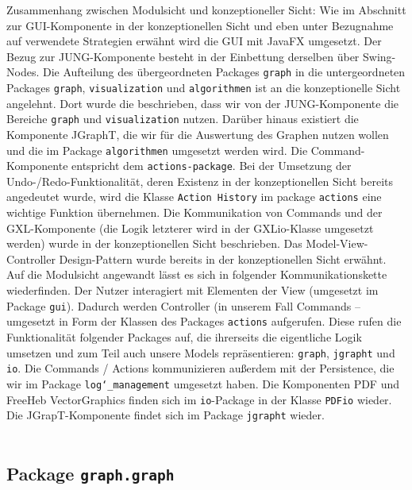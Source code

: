 \documentclass[enabledeprecatedfontcommands,fontsize=11pt,paper=a4,twoside]{scrartcl}
\newcounter{one}
\begin{document}
Zusammenhang zwischen Modulsicht und konzeptioneller Sicht: Wie im Abschnitt zur GUI-Komponente  in der konzeptionellen Sicht und eben unter Bezugnahme auf verwendete Strategien erwähnt wird die GUI mit JavaFX umgesetzt. Der Bezug zur JUNG-Komponente besteht in der Einbettung derselben über Swing-Nodes. Die Aufteilung des übergeordneten Packages \texttt{graph} in die untergeordneten Packages \texttt{graph}, \texttt{visualization} und \texttt{algorithmen} ist an die konzeptionelle Sicht angelehnt. Dort wurde die beschrieben, dass wir von der JUNG-Komponente die Bereiche \texttt{graph} und \texttt{visualization} nutzen. Darüber hinaus existiert die Komponente JGraphT, die wir für die Auswertung des Graphen nutzen wollen und die im Package \texttt{algorithmen} umgesetzt werden wird. Die Command-Komponente entspricht dem \texttt{actions-package}. Bei der Umsetzung der Undo-/Redo-Funktionalität, deren Existenz in der konzeptionellen Sicht bereits angedeutet wurde, wird die Klasse \texttt{Action History} im package \texttt{actions} eine wichtige Funktion übernehmen. Die Kommunikation von Commands und der GXL-Komponente (die Logik letzterer wird in der GXLio-Klasse umgesetzt werden) wurde in der konzeptionellen Sicht beschrieben. Das Model-View-Controller Design-Pattern wurde bereits in der konzeptionellen Sicht erwähnt. Auf die Modulsicht angewandt lässt es sich in folgender Kommunikationskette wiederfinden. Der Nutzer interagiert mit Elementen der View (umgesetzt im Package \texttt{gui}). Dadurch werden Controller (in unserem Fall Commands – umgesetzt in Form der Klassen des Packages \texttt{actions} aufgerufen. Diese rufen die Funktionalität folgender Packages auf, die ihrerseits die eigentliche Logik umsetzen und zum Teil auch unsere Models repräsentieren: \texttt{graph}, \texttt{jgrapht} und \texttt{io}. Die Commands / Actions kommunizieren außerdem mit der Persistence, die wir im Package \texttt{log\char`_management} umgesetzt haben. Die Komponenten PDF und FreeHeb VectorGraphics finden sich im \texttt{io}-Package in der Klasse \texttt{PDFio} wieder. Die JGrapT-Komponente findet sich im Package \texttt{jgrapht}  wieder. \\ \\

\newpage

\subsection{Package \texttt{graph.graph}}
\end{document}
